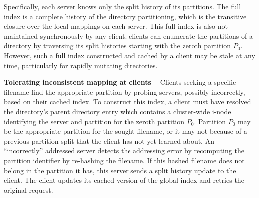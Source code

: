 Specifically, each server knows only the split history of its partitions.
The full \giga{} index is a complete history of the directory partitioning, 
which is the transitive closure over the local mappings on each server.
This full index is also not maintained synchronously by any client.
\giga{} clients can enumerate the partitions of a directory by traversing 
its split histories starting with the zeroth partition $P_0$.
However, such a full index constructed and cached by a client may be stale at
any time, particularly for rapidly mutating directories.


\textbf{Tolerating inconsistent mapping at clients -- }
Clients seeking a specific filename find the appropriate partition by probing 
servers, possibly incorrectly, based on their cached index.
To construct this index, a client must have resolved the directory's parent
directory entry which contains a cluster-wide i-node identifying the server and
partition for the zeroth partition $P_0$.
Partition $P_0$ may be the appropriate partition for the sought filename, or it
may not because of a previous partition split that the client has not yet
learned about. 
An ``incorrectly'' addressed server detects the addressing error by recomputing 
the partition identifier by re-hashing the filename.
If this hashed filename does not belong in the partition it has,
this server sends a split history update to the client.
The client updates its cached version of the global index and 
retries the original request.

